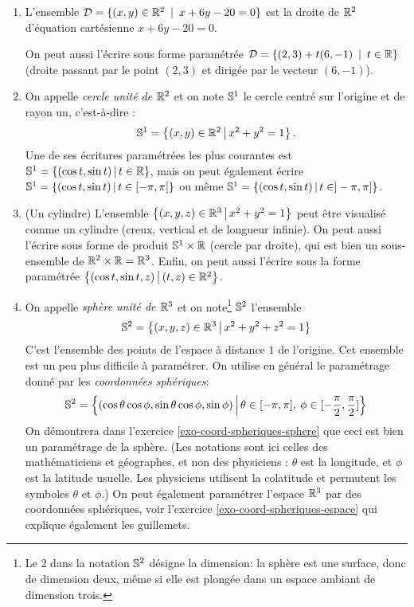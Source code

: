 \begin{exemple}
\begin{enumerate}
\item L'ensemble $\mathcal D = \{(x,y)\in \R^2\:\mid\: x+6y-20=0\}$ est la droite de $\R^2$ d'équation cartésienne $x+6y-20=0$.

On peut aussi l'écrire sous forme paramétrée $\mathcal D = \{ (2,3)+t(6,-1)\:\mid\: t\in \R\}$ (droite passant par le point $(2,3)$ et dirigée par le vecteur $(6,-1)$).
\item {} On appelle \emph{cercle unité de $\R^2$} et on note $\S^1$ le cercle centré sur l'origine et de rayon un, c'est-à-dire :
\[ \S^1=\ensemble{(x,y)\in \R^2}{x^2+y^2=1}.\]
Une de ses écritures paramétrées les plus courantes est  $\S^1=\ensemble{(\cos t,\sin t)}{t\in \R}$, mais on peut également écrire $\S^1=\ensemble{(\cos t,\sin t)}{t\in [-\pi,\pi]}$ ou même $\S^1=\ensemble{(\cos t,\sin t)}{t\in ]-\pi,\pi]}$.
\item (Un cylindre)  L'ensemble $\ensemble{(x,y,z)\in \R^3}{x^2+y^2=1}$ peut être visualisé comme un  cylindre (\og creux, vertical et de longueur infinie\fg). On peut aussi l'écrire sous forme de produit $\S^1 \times \R$ (cercle par droite), qui est bien un sous-ensemble de $\R^2\times \R = \R^3$. Enfin, on peut aussi l'écrire sous la forme paramétrée $\ensemble{(\cos t,\sin t,z)}{(t,z)\in \R^2}$.
\item {} On appelle \emph{sphère unité de $\R^3$} et on note\footnote{Le \og $2$\fg{} dans la notation $\S^2$ désigne la \og dimension\fg{}: la sphère est une surface, donc de \og dimension\fg{} deux, même si elle est plongée dans un espace ambiant de dimension trois.} $\S^2$ l'ensemble
\[ \S^2 = \ensemble{(x,y,z)\in \R^3}{x^2+y^2+z^2=1}\]
C'est l'ensemble des points de l'espace à distance $1$ de l'origine. Cet ensemble est un peu plus difficile à paramétrer. On utilise en général le paramétrage donné par les \emph{coordonnées sphériques}:
\[ \S^2 = \ensemble{(\cos\theta\cos\phi, \sin\theta\cos\phi, \sin\phi)}{\theta \in [-\pi,\pi], \: \phi\in[-\frac{\pi}{2},\frac{\pi}{2}]}\]
On démontrera dans l'exercice \ref{exo-coord-spheriques-sphere} que ceci est bien un paramétrage de la sphère. (Les notations sont ici celles des mathématiciens et géographes, et non des physiciens : $\theta$ est la longitude, et $\phi$ est la latitude usuelle. Les physiciens utilisent la colatitude et permutent les symboles $\theta$ et $\phi$.) On peut également paramétrer l'espace $\R^3$ par des \og coordonnées\fg{} sphériques, voir l'exercice \ref{exo-coord-spheriques-espace} qui explique également les guillemets.
\end{enumerate}
\end{exemple}



